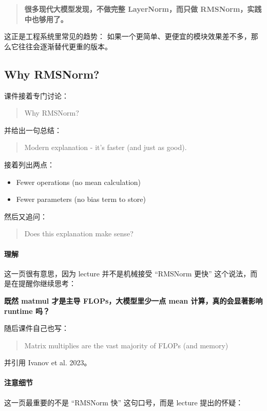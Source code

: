 \documentclass[a4paper,UTF8]{article}
\numberwithin{equation}{section}
\begin{document}
\begin{quote}
\textbf{很多现代大模型发现，不做完整 LayerNorm，而只做 RMSNorm，实践中也够用了。}
\end{quote}

这正是工程系统里常见的趋势：  
如果一个更简单、更便宜的模块效果差不多，那么它往往会逐渐替代更重的版本。

\subsection{Why RMSNorm?}

课件接着专门讨论：
\begin{quote}
Why RMSNorm?
\end{quote}

并给出一句总结：
\begin{quote}
Modern explanation - it’s faster (and just as good).
\end{quote}

接着列出两点：
\begin{itemize}
    \item Fewer operations (no mean calculation)
    \item Fewer parameters (no bias term to store)
\end{itemize}

然后又追问：
\begin{quote}
Does this explanation make sense?
\end{quote}

\paragraph{理解}
这一页很有意思，因为 lecture 并不是机械接受 ``RMSNorm 更快'' 这个说法，而是在提醒你继续思考：

\begin{center}
\textbf{既然 matmul 才是主导 FLOPs，大模型里少一点 mean 计算，真的会显著影响 runtime 吗？}
\end{center}

随后课件自己也写：
\begin{quote}
Matrix multiplies are the vast majority of FLOPs (and memory)
\end{quote}

并引用 Ivanov et al. 2023。

\paragraph{注意细节}
这一页最重要的不是 ``RMSNorm 快'' 这句口号，而是 lecture 提出的怀疑：
\end{document}
